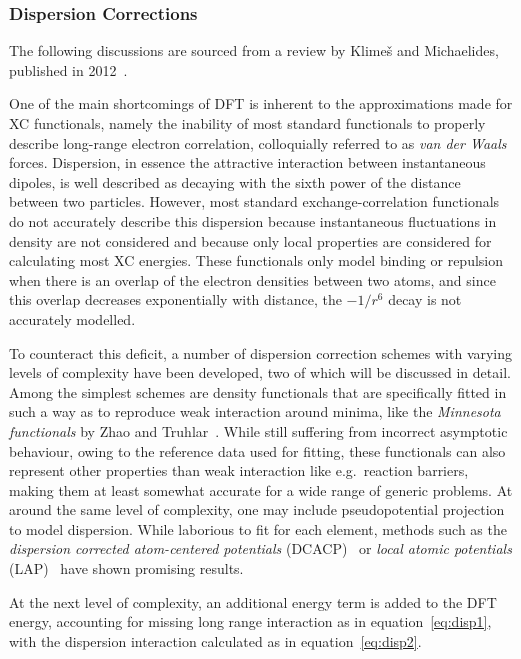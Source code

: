 \documentclass[12pt]{article}
\begin{document}
\subsubsection{Dispersion Corrections}
The following discussions are sourced from a review by Klimeš and Michaelides, published in 2012~\cite{Klime2012}.
\\ \par \noindent One of the main shortcomings of DFT is inherent to the approximations made for XC functionals, namely the inability of most standard functionals to properly describe long-range electron correlation, colloquially referred to as \textit{van der Waals} forces.
Dispersion, in essence the attractive interaction between instantaneous dipoles, is well described as decaying with the sixth power of the distance between two particles.
However, most standard exchange-correlation functionals do not accurately describe this dispersion because instantaneous fluctuations in density are not considered and because only local properties are considered for calculating most XC energies.
These functionals only model binding or repulsion when there is an overlap of the electron densities between two atoms, and since this overlap decreases exponentially with distance, the $-1/r^6$ decay is not accurately modelled.
\\ \par \noindent To counteract this deficit, a number of dispersion correction schemes with varying levels of complexity have been developed, two of which will be discussed in detail.
Among the simplest schemes are density functionals that are specifically fitted in such a way as to reproduce weak interaction around minima, like the \textit{Minnesota functionals} by Zhao and Truhlar~\cite{Zhao2007-oa}.
While still suffering from incorrect asymptotic behaviour, owing to the reference data used for fitting, these functionals can also represent other properties than weak interaction like e.g.~reaction barriers, making them at least somewhat accurate for a wide range of generic problems.
At around the same level of complexity, one may include pseudopotential projection to model dispersion.
While laborious to fit for each element, methods such as the \textit{dispersion corrected atom-centered potentials} (DCACP)~\cite{vonLilienfeld2004} or \textit{local atomic potentials} (LAP)~\cite{Sun2008} have shown promising results.
\\ \par \noindent At the next level of complexity, an additional energy term is added to the DFT energy, accounting for missing long range interaction as in equation~\ref{eq:disp1}, with the dispersion interaction calculated as in equation~\ref{eq:disp2}.
\end{document}
